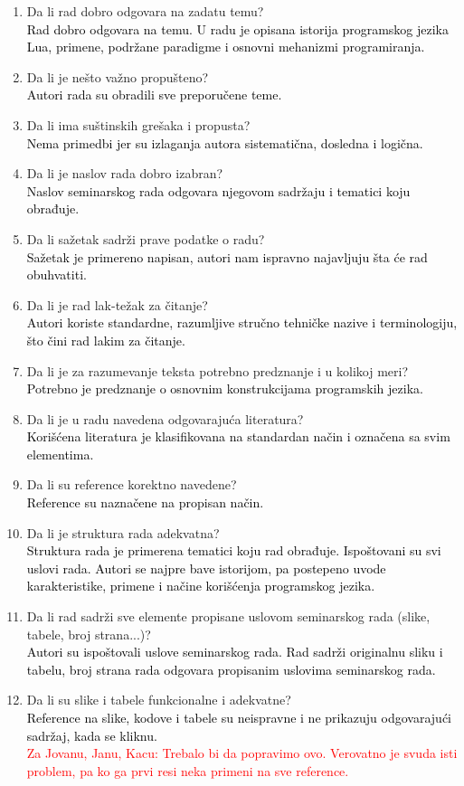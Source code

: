 \documentclass[a4paper]{report}
\newcommand{\odgovor}[1]{\textcolor{black}{#1}}
\newcommand{\note}[1]{\textcolor{red}{#1}}
\begin{document}
\begin{enumerate}
\item Da li rad dobro odgovara na zadatu temu?\\
\odgovor{Rad dobro odgovara na temu. U radu je opisana istorija programskog jezika Lua, primene, podržane paradigme i osnovni mehanizmi programiranja.}
\item Da li je nešto važno propušteno?\\
\odgovor{Autori rada su obradili sve preporučene teme.}
\item Da li ima suštinskih grešaka i propusta?\\
\odgovor{Nema primedbi jer su izlaganja autora sistematična, dosledna i logična.}
\item Da li je naslov rada dobro izabran?\\
\odgovor{Naslov seminarskog rada odgovara njegovom sadržaju i tematici koju obrađuje.}
\item Da li sažetak sadrži prave podatke o radu?\\
\odgovor{Sažetak je primereno napisan, autori nam ispravno najavljuju šta će rad obuhvatiti.}
\item Da li je rad lak-težak za čitanje?\\
\odgovor{Autori koriste standardne, razumljive stručno tehničke nazive i terminologiju, što čini rad lakim za čitanje.}
\item Da li je za razumevanje teksta potrebno predznanje i u kolikoj meri?\\
\odgovor{Potrebno je predznanje o osnovnim konstrukcijama programskih jezika.}
\item Da li je u radu navedena odgovarajuća literatura?\\
\odgovor{Korišćena literatura je klasifikovana na standardan način i označena sa svim elementima.}
\item Da li su reference korektno navedene?\\
\odgovor{Reference su naznačene na propisan način.}
\item Da li je struktura rada adekvatna?\\
\odgovor{Struktura rada je primerena tematici koju rad obrađuje. Ispoštovani su svi uslovi rada. Autori se najpre bave istorijom, pa postepeno uvode karakteristike, primene i načine korišćenja programskog jezika.}
\item Da li rad sadrži sve elemente propisane uslovom seminarskog rada (slike, tabele, broj strana...)?\\
\odgovor{Autori su ispoštovali uslove seminarskog rada. Rad sadrži originalnu sliku i tabelu, broj strana rada odgovara propisanim uslovima seminarskog rada.}
\item Da li su slike i tabele funkcionalne i adekvatne?\\
\odgovor{Reference na slike, kodove i tabele su neispravne i ne prikazuju odgovarajući sadržaj, kada se kliknu.} \\
\note{Za Jovanu, Janu, Kacu: Trebalo bi da popravimo ovo. Verovatno je svuda isti problem, pa ko ga prvi resi neka primeni na sve reference.}
\end{enumerate}
\end{document}
